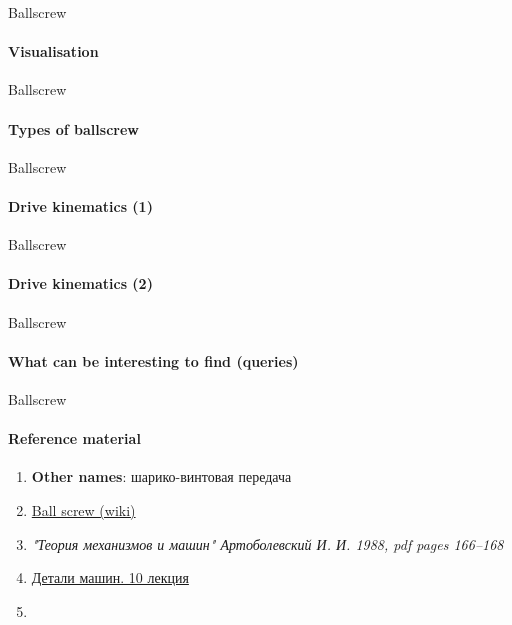 \documentclass[aspectratio=169]{beamer}
\begin{document}
\begin{frame}[t]{Ballscrew}
    \framesubtitle{Visualisation}

\end{frame}

\begin{frame}[t]{Ballscrew}
    \framesubtitle{Types of ballscrew}

\end{frame}

\begin{frame}[t]{Ballscrew}
    \framesubtitle{Drive kinematics (1)}

\end{frame}

\begin{frame}[t]{Ballscrew}
    \framesubtitle{Drive kinematics (2)}

\end{frame}

\begin{frame}[t]{Ballscrew}
    \framesubtitle{What can be interesting to find (queries)}

\end{frame}

\begin{frame}[t]{Ballscrew}
    \framesubtitle{Reference material}
    \begin{enumerate}
        \item \textbf{Other names}: шарико-винтовая передача
        \item \href{https://en.wikipedia.org/wiki/Ball_screw}{Ball screw (wiki)}
        \item \textit{"Теория механизмов и машин" Артоболевский И. И. 1988, pdf pages 166--168 }
        \item \href{https://studfile.net/preview/2156460/}{Детали машин. 10 лекция}
        \item 
    \end{enumerate}
\end{frame}
\end{document}
